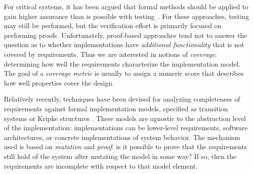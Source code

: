 For critical systems, it has been argued that formal methods
should be applied to gain higher assurance than is possible with testing~\cite{Miller10:CACM,Rushby09:SEFM,Hardin09:Security}.  For these approaches, testing may still be performed, but the verification effort is primarily focused on performing proofs.  Unfortunately, proof-based approaches tend not to answer the question as to whether implementations have {\em additional functionality} that is not covered by requirements.  %
%
Thus we are interested in notions of {\em coverage}: determining how well the requirements characterize the implementation model.
The goal of a {\em coverage metric} is usually to assign a numeric score that describes how well properties cover the design.

Relatively recently, techniques have been devised for analyzing completeness of requirements against formal implementation models, specified as transition systems or Kripke structures \cite{chockler2001practical,das2005formal, claessen2007coverage, grosse2007estimating,chockler_coverage_2003,chockler2010coverage,
Kupferman:2006:SCF,kupferman_theory_2008}.  These models are agnostic to the abstraction level of the implementation: implementations can be lower-level requirements, software architectures, or concrete implementations of system behavior.  The mechanism used is based on {\em mutation} and {\em proof}: is it possible to prove that the requirements still hold of the system after mutating the model in some way?  If so, then the requirements are incomplete with respect to that model element.


